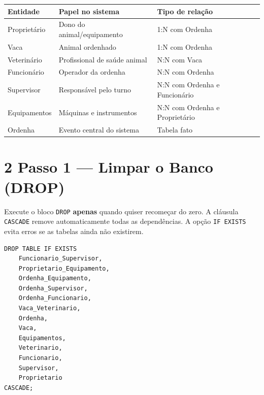 \documentclass[12pt]{article}
\begin{document}
\vspace{0.2cm}
\begin{center}
\small
\begin{tabular}{|l|l|l|}
\hline
\textbf{Entidade}       & \textbf{Papel no sistema}               & \textbf{Tipo de relação} \\
\hline
Proprietário            & Dono do animal/equipamento              & 1:N com Ordenha \\
Vaca                    & Animal ordenhado                        & 1:N com Ordenha \\
Veterinário             & Profissional de saúde animal            & N:N com Vaca \\
Funcionário             & Operador da ordenha                     & N:N com Ordenha \\
Supervisor              & Responsável pelo turno                  & N:N com Ordenha e Funcionário \\
Equipamentos            & Máquinas e instrumentos                 & N:N com Ordenha e Proprietário \\
Ordenha                 & Evento central do sistema               & Tabela fato \\
\hline
\end{tabular}
\end{center}

\vspace{0.5cm}

\section*{2 \enspace Passo 1 — Limpar o Banco (DROP)}

\begin{atencao}
Execute o bloco \texttt{DROP} \textbf{apenas} quando quiser recomeçar do zero.
A cláusula \texttt{CASCADE} remove automaticamente todas as dependências.
A opção \texttt{IF EXISTS} evita erros se as tabelas ainda não existirem.
\end{atencao}

\vspace{0.3cm}

\begin{lstlisting}[caption={Remoção segura de todas as tabelas}]
DROP TABLE IF EXISTS
    Funcionario_Supervisor,
    Proprietario_Equipamento,
    Ordenha_Equipamento,
    Ordenha_Supervisor,
    Ordenha_Funcionario,
    Vaca_Veterinario,
    Ordenha,
    Vaca,
    Equipamentos,
    Veterinario,
    Funcionario,
    Supervisor,
    Proprietario
CASCADE;
\end{lstlisting}
\end{document}

